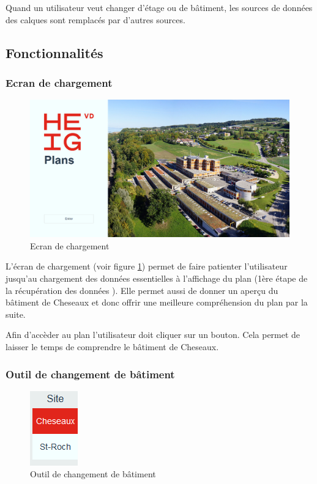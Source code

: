 \documentclass[
    iai, %
    il, %
]{heig-tb}
\begin{document}
Quand un utilisateur veut changer d'étage ou de bâtiment, les sources de données des calques sont remplacés par d'autres sources.

\subsection{Fonctionnalités}

\subsubsection{Ecran de chargement}

\begin{figure}[h]
    \centering
    \includegraphics[scale=0.3]{frontend-loading-screen.png}
    \caption{Ecran de chargement}
    \label{fig:ecran-chargement}
\end{figure}

L'écran de chargement (voir figure \ref{fig:ecran-chargement}) permet de faire patienter l'utilisateur jusqu'au chargement des données essentielles à l'affichage du plan
(1ère étape de la récupération des données ).
Elle permet aussi de donner un aperçu du bâtiment de Cheseaux et donc offrir une meilleure compréhension du plan par la suite.

Afin d'accèder au plan l'utilisateur doit cliquer sur un bouton. Cela permet de laisser le temps de comprendre le bâtiment de Cheseaux.

\subsubsection{Outil de changement de bâtiment}

\begin{figure}[h]
    \centering
    \includegraphics[scale=0.8]{frontend-buildingChange.png}
    \caption{Outil de changement de bâtiment}
    \label{fig:changement-batiment}
\end{figure}
\end{document}
